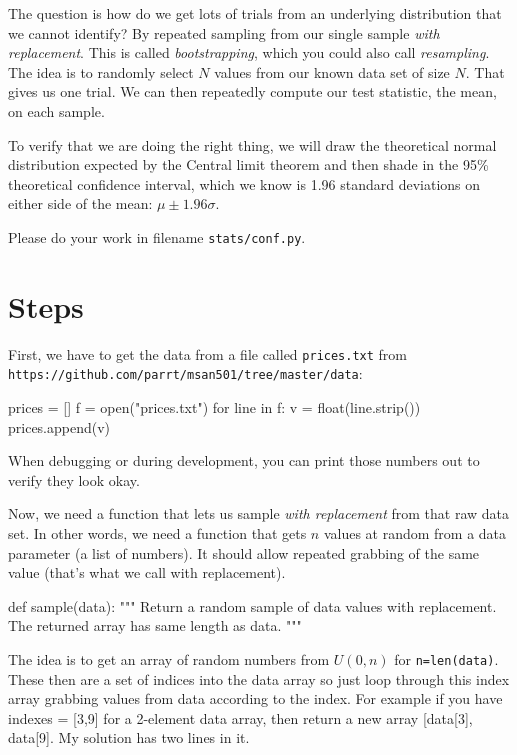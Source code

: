\begin{fullwidth}
The question is how do we get lots of trials from an underlying distribution that we cannot identify? By repeated sampling from our single sample {\em with replacement}. This is called {\em bootstrapping}, which you could also call {\em resampling}. The idea is to randomly select $N$ values from our known data set of size $N$. That gives us one trial. We can then repeatedly compute our test statistic, the mean, on each sample.

To verify that we are doing the right thing, we will draw the theoretical normal distribution expected by the Central limit theorem and then shade in the 95\% theoretical confidence interval, which we know is 1.96 standard deviations on either side of the mean: $\mu \pm 1.96\sigma$.

Please do your work in filename {\tt stats/conf.py}.

\section{Steps}

\step First, we have to get the data from a file called {\tt prices.txt} from \\
{\tt\small https://github.com/parrt/msan501/tree/master/data}:

\begin{pyverbatim}
prices = []
f = open("prices.txt")
for line in f:
	v = float(line.strip())
	prices.append(v)
\end{pyverbatim}

When debugging or during development, you can print those numbers out to verify they look okay.

\step Now, we need a function that lets us sample {\em with replacement} from that raw data set. In other words, we need a function that gets $n$ values at random from a data parameter (a list of numbers). It should allow repeated grabbing of the same value (that's what we call with replacement).

\begin{pyverbatim}
def sample(data):
	"""
	Return a random sample of data values with replacement.
	The returned array has same length as data.
	"""
\end{pyverbatim}

The idea is to get an array of random numbers from $U(0,n)$ for {\tt n=len(data)}. These then are a set of indices into the data array so just loop through this index array grabbing values from data according to the index. For example if you have indexes = [3,9] for a 2-element data array, then return a new array [data[3], data[9]. My solution has two lines in it.


\end{fullwidth}
